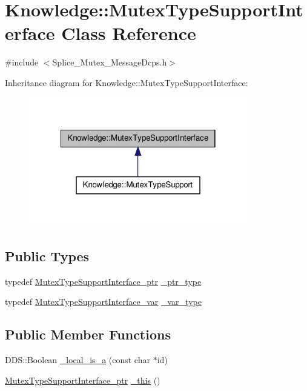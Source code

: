 \hypertarget{classKnowledge_1_1MutexTypeSupportInterface}{
\section{Knowledge::MutexTypeSupportInterface Class Reference}
\label{d4/df0/classKnowledge_1_1MutexTypeSupportInterface}
}


{\ttfamily \#include $<$Splice\_\-Mutex\_\-MessageDcps.h$>$}



Inheritance diagram for Knowledge::MutexTypeSupportInterface:
\nopagebreak
\begin{figure}[H]
\begin{center}
\leavevmode
\includegraphics[width=270pt]{df/dbe/classKnowledge_1_1MutexTypeSupportInterface__inherit__graph}
\end{center}
\end{figure}
\subsection*{Public Types}
\begin{DoxyCompactItemize}
\item 
typedef \hyperlink{classKnowledge_1_1MutexTypeSupportInterface}{MutexTypeSupportInterface\_\-ptr} \hyperlink{classKnowledge_1_1MutexTypeSupportInterface_a509c42b72d1043ac6b3cdbe678335f6f}{\_\-ptr\_\-type}
\item 
typedef \hyperlink{namespaceKnowledge_acaf157b3817dc52861f4ff75fcd3c2d4}{MutexTypeSupportInterface\_\-var} \hyperlink{classKnowledge_1_1MutexTypeSupportInterface_a62ca1346af2778b03bf35651e06ccadf}{\_\-var\_\-type}
\end{DoxyCompactItemize}
\subsection*{Public Member Functions}
\begin{DoxyCompactItemize}
\item 
DDS::Boolean \hyperlink{classKnowledge_1_1MutexTypeSupportInterface_af6fbc4387f2ece8048668e645fb01738}{\_\-local\_\-is\_\-a} (const char $\ast$id)
\item 
\hyperlink{classKnowledge_1_1MutexTypeSupportInterface}{MutexTypeSupportInterface\_\-ptr} \hyperlink{classKnowledge_1_1MutexTypeSupportInterface_a989994179337e5d8a48415edd788ab07}{\_\-this} ()
\end{DoxyCompactItemize}
